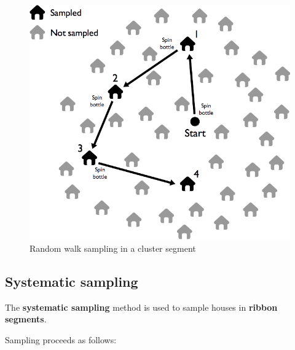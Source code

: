 \documentclass[12pt,]{book}
\theoremstyle{definition}
\theoremstyle{definition}
\theoremstyle{definition}
\theoremstyle{remark}
\begin{document}
\begin{figure}[h]

{\centering \includegraphics[width=9.72in]{figures/stage2sample8} 

}

\caption{Random walk sampling in a cluster segment}\label{fig:sample22}
\end{figure}

\hypertarget{systematic-sampling}{%
\subsection{Systematic sampling}\label{systematic-sampling}}

The \textbf{systematic sampling} method is used to sample houses in
\textbf{ribbon segments}.

Sampling proceeds as follows:
\end{document}
